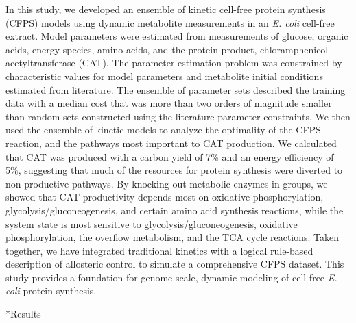 \documentclass[12pt]{article}
\makeatletter
\renewcommand\section{\@startsection
	{subsection}{2}{0mm}
	{-0.2in}
	{0.05\baselineskip}
	{\normalfont\large\bfseries}}
\makeatother
\begin{document}
In this study, we developed an ensemble of kinetic cell-free protein synthesis (CFPS) models using dynamic metabolite measurements in an \textit{E. coli} cell-free extract.
Model parameters were estimated from measurements of glucose, organic acids, energy species, amino acids, and the protein product, chloramphenicol acetyltransferase (CAT).
The parameter estimation problem was constrained by characteristic values for model parameters and metabolite initial conditions estimated from literature.
The ensemble of parameter sets described the training data with a median cost that was more than two orders of magnitude smaller than random sets constructed using the literature parameter constraints.
We then used the ensemble of kinetic models to analyze the optimality of the CFPS reaction, and the pathways most important to CAT production.
We calculated that CAT was produced with a carbon yield of 7\% and an energy efficiency of 5\%, suggesting that much of the resources for protein synthesis were diverted to non-productive pathways.
By knocking out metabolic enzymes in groups, we showed that CAT productivity depends most on oxidative phosphorylation, glycolysis/gluconeogenesis, and certain amino acid synthesis reactions, while the system state is most sensitive to glycolysis/gluconeogenesis, oxidative phosphorylation, the overflow metabolism, and the TCA cycle reactions.
Taken together, we have integrated traditional kinetics with a logical rule-based description of allosteric control to simulate a comprehensive CFPS dataset.
This study provides a foundation for genome scale, dynamic modeling of cell-free \textit{E. coli} protein synthesis.

\clearpage

\section*{Results}
\end{document}
